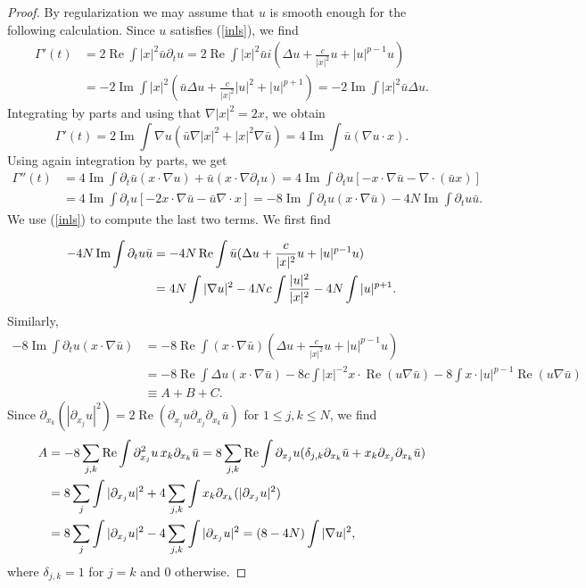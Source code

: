 \documentclass[reqno]{amsart}
\let\le=\leqslant
\DeclareMathOperator \im{Im}
\DeclareMathOperator \re{Re}
\theoremstyle{plain}
\theoremstyle{definition}
\numberwithin{equation}{section}
\begin{document}
\begin{proof} By regularization we may assume that 
$u$ is smooth enough for the following calculation. Since $u$ satisfies (\ref{inls}), we find
\[
\begin{split}
\Gamma'(t)&=2\re\int|x|^2\bar{u}\partial_tu=2\re\int|x|^2\bar{u}i(\Delta u+\frac{c}{|x|^2}u+|u|^{p-1}u)\\
&=-2\im\int|x|^2(\bar{u}\Delta u+\frac{c}{|x|^2}|u|^2+|u|^{p+1})=-2\im\int|x|^2\bar{u}\Delta u.
\end{split}
\]
Integrating by parts and using that $\nabla |x|^2=2x$, we obtain
\[
\Gamma'(t)=2\im\int\nabla u(\bar{u}\nabla|x|^2+|x|^2\nabla\bar{u})=4\im\int\bar{u}(\nabla u\cdot x).
\]
Using again integration by parts, we get
\[
\begin{split}
\Gamma''(t)&=4\im\int\partial_t\bar{u}(x\cdot\nabla u)+\bar{u}(x\cdot\nabla\partial_tu)
=4\im\int\partial_tu[-x\cdot\nabla\bar{u}-\nabla\cdot(\bar{u}x)]\\
&=4\im\int\partial_tu[-2x\cdot\nabla\bar{u}-\bar{u}\nabla\cdot x]
=-8\im\int\partial_tu(x\cdot\nabla\bar{u})-4N\im\int\partial_tu\bar{u}.
\end{split}
\]
We use (\ref{inls}) to compute the last two terms. We first find

\begin{align}
-4N\im\int\partial_tu\bar{u}&=-4N\re\int\bar{u}(\Delta u+\frac{c}{|x|^2}u+|u|^{p-1}u)\notag
\\
&=4N\int{|\nabla u|^2}-4Nc\int\frac{|u|^2}{|x|^2}-4N\int|u|^{p+1}. \label{viriala}
\end{align}
Similarly,
\[
\begin{split}
-8\im\int\partial_tu(x\cdot \nabla \bar{u})&=
-8\re\int(x\cdot\nabla\bar{u})(\Delta u+\frac{c}{|x|^2}u+|u|^{p-1}u)
\\
&=-8\re\int\Delta u(x\cdot\nabla\bar{u})-8c\int|x|^{-2}x\cdot\re(u\nabla\bar{u})
-8\int x\cdot|u|^{p-1}\re(u\nabla\bar{u})
\\
&\equiv A+B+C.
\end{split}
\]
Since $\partial_{x_k}(|\partial_{x_j}u|^2) = 2\re(\partial_{x_j}u\partial_{x_j}\partial_{x_k}\bar u)$
for $1\le j,k\le N$, we find
\begin{align}
A &= -8\sum_{j,k} \re\int \partial_{x_j}^2u\, x_k\partial_{x_k}\bar u
= 8\sum_{j,k} \re\int \partial_{x_j}u (\delta_{j,k}\partial_{x_k}\bar u + x_k\partial_{x_j}\partial_{x_k}\bar u) \notag \\
&= 8\sum_j \int |\partial_{x_j}u|^2 +4\sum_{j,k} \int x_k\partial_{x_k}(|\partial_{x_j}u|^2) \notag \\
&= 8\sum_j \int |\partial_{x_j}u|^2 -4\sum_{j,k} \int |\partial_{x_j}u|^2 \label{virialpart3}
= (8-4N)\int |\nabla u|^2, 
\end{align}
where $\delta_{j,k}=1$ for $j=k$ and $0$ otherwise.



\end{proof}
\end{document}
